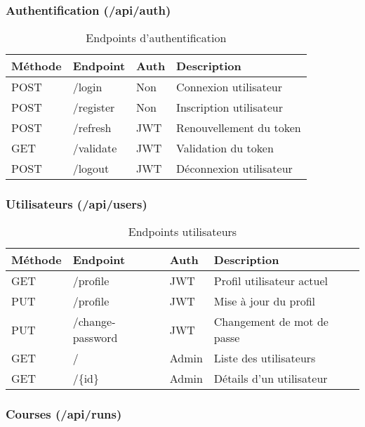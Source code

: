 \subsubsection{Authentification (/api/auth)}

\begin{table}[H]
\centering
\small
\begin{tabular}{|l|l|l|p{5cm}|}
\hline
\textbf{Méthode} & \textbf{Endpoint} & \textbf{Auth} & \textbf{Description} \\
\hline
POST & /login & Non & Connexion utilisateur \\
POST & /register & Non & Inscription utilisateur \\
POST & /refresh & JWT & Renouvellement du token \\
GET & /validate & JWT & Validation du token \\
POST & /logout & JWT & Déconnexion utilisateur \\
\hline
\end{tabular}
\caption{Endpoints d'authentification}
\end{table}

\subsubsection{Utilisateurs (/api/users)}

\begin{table}[H]
\centering
\small
\begin{tabular}{|l|l|l|p{5cm}|}
\hline
\textbf{Méthode} & \textbf{Endpoint} & \textbf{Auth} & \textbf{Description} \\
\hline
GET & /profile & JWT & Profil utilisateur actuel \\
PUT & /profile & JWT & Mise à jour du profil \\
PUT & /change-password & JWT & Changement de mot de passe \\
GET & / & Admin & Liste des utilisateurs \\
GET & /\{id\} & Admin & Détails d'un utilisateur \\
\hline
\end{tabular}
\caption{Endpoints utilisateurs}
\end{table}

\subsubsection{Courses (/api/runs)}

